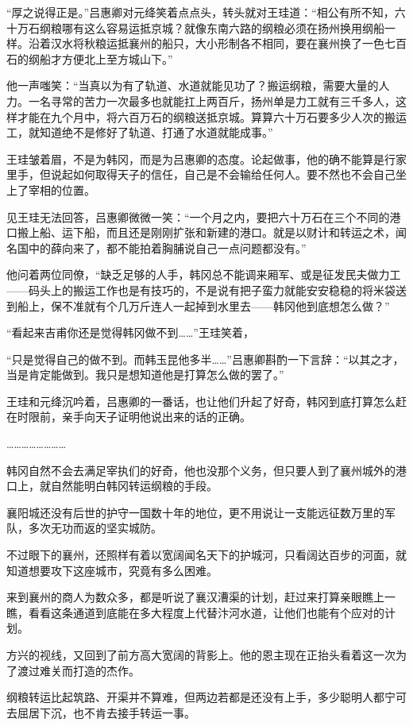 “厚之说得正是。”吕惠卿对元绛笑着点点头，转头就对王珪道：“相公有所不知，六十万石纲粮哪有这么容易运抵京城？就像东南六路的纲粮必须在扬州换用纲船一样。沿着汉水将秋粮运抵襄州的船只，大小形制各不相同，要在襄州换了一色七百石的纲船才方便北上至方城山下。”

他一声嗤笑：“当真以为有了轨道、水道就能见功了？搬运纲粮，需要大量的人力。一名寻常的苦力一次最多也就能扛上两百斤，扬州单是力工就有三千多人，这样才能在九个月中，将六百万石的纲粮送抵京城。算算六十万石要多少人次的搬运工，就知道绝不是修好了轨道、打通了水道就能成事。”

王珪皱着眉，不是为韩冈，而是为吕惠卿的态度。论起做事，他的确不能算是行家里手，但说起如何取得天子的信任，自己是不会输给任何人。要不然也不会自己坐上了宰相的位置。

见王珪无法回答，吕惠卿微微一笑：“一个月之内，要把六十万石在三个不同的港口搬上船、运下船，而且还是刚刚扩张和新建的港口。就是以财计和转运之术，闻名国中的薛向来了，都不能拍着胸脯说自己一点问题都没有。”

他问着两位同僚，“缺乏足够的人手，韩冈总不能调来厢军、或是征发民夫做力工——码头上的搬运工作也是有技巧的，不是说有把子蛮力就能安安稳稳的将米袋送到船上，保不准就有个几万斤连人一起掉到水里去——韩冈他到底想怎么做？”

“看起来吉甫你还是觉得韩冈做不到……”王珪笑着，

“只是觉得自己的做不到。而韩玉昆他多半……”吕惠卿斟酌一下言辞：“以其之才，当是肯定能做到。我只是想知道他是打算怎么做的罢了。”

王珪和元绛沉吟着，吕惠卿的一番话，也让他们升起了好奇，韩冈到底打算怎么赶在时限前，亲手向天子证明他说出来的话的正确。

……………………

韩冈自然不会去满足宰执们的好奇，他也没那个义务，但只要人到了襄州城外的港口上，就自然能明白韩冈转运纲粮的手段。

襄阳城还没有后世的护守一国数十年的地位，更不用说让一支能远征数万里的军队，多次无功而返的坚实城防。

不过眼下的襄州，还照样有着以宽阔闻名天下的护城河，只看阔达百步的河面，就知道想要攻下这座城市，究竟有多么困难。

来到襄州的商人为数众多，都是听说了襄汉漕渠的计划，赶过来打算亲眼瞧上一瞧，看看这条通道到底能在多大程度上代替汴河水道，让他们也能有个应对的计划。

方兴的视线，又回到了前方高大宽阔的背影上。他的恩主现在正抬头看着这一次为了渡过难关而打造的杰作。

纲粮转运比起筑路、开渠并不算难，但两边若都是还没有上手，多少聪明人都宁可去屈居下沉，也不肯去接手转运一事。

